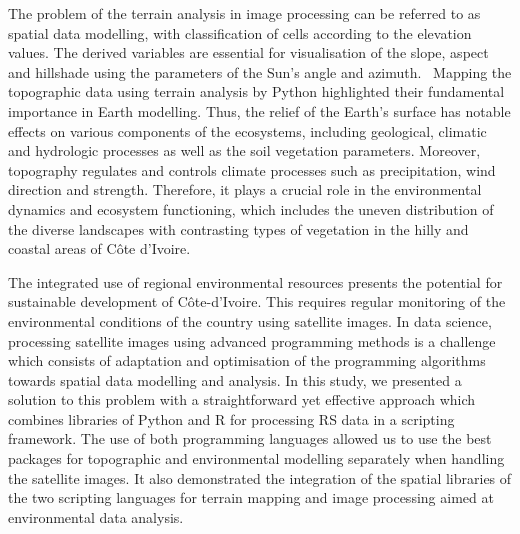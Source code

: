 \documentclass[jimaging,article,accept,pdftex,moreauthors]{Definitions/mdpi}
\begin{document}
The problem of the terrain analysis in image processing can be referred {to }as spatial data modelling, with classification of cells according to the elevation values{. The derived} variables {are essential }for visualisation of the slope, aspect and hillshade using the parameters of the Sun's angle and azimuth.%
~Mapping the topographic data {using terrain analysis by Python }highlighted their fundamental importance in Earth modelling. {Thus, the }relief {of the Earth's surface }has {notable }effects on various components of the {ecosystems}, including{ }geological, climatic {and} hydrologic processes {as well as} the soil vegetation parameters. {Moreover, }topography regulates and controls climate processes {such as }precipitation, wind direction and strength. Therefore, it plays a crucial role in the environmental dynamics and ecosystem functioning, which includes the uneven distribution{ of the diverse landscapes with }contrasting types of vegetation in the hilly and coastal areas of Côte d'Ivoire. 

{The }integrated use of regional environmental resources presents {the} potential for sustainable development of Côte-d'Ivoire. This requires regular monitoring of the environmental conditions of the country using satellite images. In data science, processing satellite images using advanced programming methods is a challenge which consists of adaptation and optimisation of {the programming }algorithms towards spatial data modelling and analysis. In this study, we presented a solution to this problem with a straightforward yet effective approach which combines libraries of Python and R for processing {RS} data in a scripting framework. The use of both programming languages{ allowed us} to {use} the best packages for topographic and environmental modelling separately when handling the satellite images. {It also demonstrated the integration of the spatial} libraries of {the }two scripting languages{ }for{ }terrain mapping and{ }image processing {aimed at environmental data analysis}. 
\end{document}
